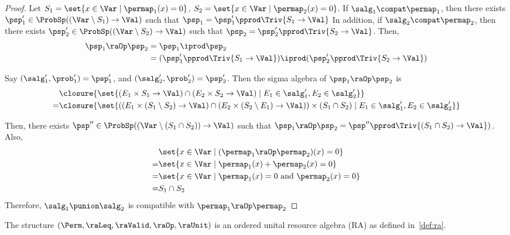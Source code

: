 \documentclass[acmsmall,nonacm,screen,appendix]{acmart}
\begin{document}
\begin{proof}
  Let $S_1 = \set{x \in \Var \mid \permap_1(x) = 0}$,
  $S_2 = \set{x \in \Var \mid \permap_2(x) = 0}$.
  If $\salg_1\compat\permap_1$, then there exists
  $\psp_1' \in \ProbSp((\Var \setminus S_1) \to \Val)$
  such that
  $\psp_1 = \psp_1' \pprod \Triv{S_1 \to \Val}$
  In addition, if $\salg_2\compat\permap_2$, then there exists
  $\psp_2' \in \ProbSp((\Var \setminus S_2) \to \Val)$
  such that
  $\psp_2 = \psp_2' \pprod \Triv{S_2 \to \Val}$.
  Then,
  \begin{align*}
    \psp_1 \raOp \psp_2
    &= \psp_1 \iprod \psp_2 \\
    &= (\psp_1' \pprod \Triv{S_1 \to \Val}) \iprod
    (\psp_2' \pprod \Triv{S_2 \to \Val})
  \end{align*}

  Say $(\salg_1', \prob_1') = \psp_1'$,
  and  $(\salg_2', \prob_2') = \psp_2'$.
  Then the sigma algebra of $\psp_1 \raOp \psp_2$
  is
  \begin{align*}
  &\closure{\set{(E_1 \times S_1 \to \Val) \cap (E_2 \times S_2 \to \Val) \mid E_1 \in \salg_1', E_2 \in \salg_2'}} \\
    = & \closure{\set{\left( (E_1 \times (S_1 \setminus S_2) \to \Val) \cap (E_2 \times (S_2 \setminus E_1) \to \Val) \right) \times (S_1 \cap S_2) \mid E_1 \in \salg_1', E_2 \in \salg_2'}}
  \end{align*}

  Then, there exists $\psp'' \in \ProbSp((\Var \setminus (S_1 \cap S_2)) \to \Val)$ such that
  $\psp_1 \raOp \psp_2 = \psp'' \pprod  \Triv{(S_1 \cap S_2) \to \Val})$.
  Also,
  \begin{align*}
     &\set{x \in \Var \mid (\permap_1 \raOp \permap_2)(x) = 0} \\
    =&\set{x \in \Var \mid \permap_1(x) + \permap_2(x) = 0} \\
    =&\set{x \in \Var \mid \permap_1(x) = 0 \text{ and } \permap_2(x) = 0} \\
    =& S_1 \cap S_2
  \end{align*}
  Therefore, $\salg_1 \punion \salg_2$ is compatible with $\permap_1 \raOp \permap_2$
\end{proof}

\begin{lemma}
  The structure $(\Perm, \raLeq, \raValid, \raOp, \raUnit)$ is an ordered unital resource algebra (RA) as defined
  in~\cref{def:ra}.
\end{lemma}
\end{document}
